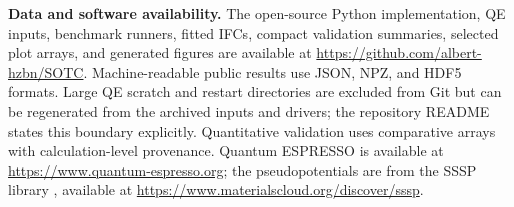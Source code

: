 \documentclass[aps,prb,reprint,amsmath,amssymb,floatfix]{revtex4-2}
\begin{document}
\color{revisionblue}
\textbf{Data and software availability.} The open-source Python implementation,
QE inputs, benchmark runners, fitted IFCs, compact validation summaries,
selected plot arrays, and generated figures are available at
\url{https://github.com/albert-hzbn/SOTC}. Machine-readable public results use
JSON, NPZ, and HDF5 formats. Large QE scratch and restart directories are
excluded from Git but can be regenerated from the archived inputs and drivers;
the repository README states this boundary explicitly. Quantitative validation
uses comparative arrays with calculation-level provenance. Quantum ESPRESSO
\cite{ref46} is available at
\url{https://www.quantum-espresso.org}; the pseudopotentials are from the SSSP
library \cite{ref47}, available at
\url{https://www.materialscloud.org/discover/sssp}.
\color{black}


\end{document}
